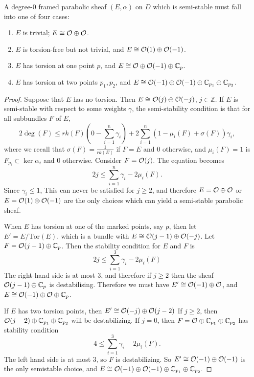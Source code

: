 	\begin{lemma}
		A degree-0 framed parabolic sheaf $(E,\alpha)$ on $D$ which is semi-stable must fall into one of four cases:
		\begin{enumerate}
			\item $E$ is trivial; $E\cong \mathcal{O}\oplus \mathcal{O}$.
			\item $E$ is torsion-free but not trivial, and $E\cong \mathcal{O}(1)\oplus\mathcal{O}(-1)$.
			\item $E$ has torsion at one point $p$, and $E\cong \mathcal{O}\oplus\mathcal{O}(-1)\oplus \mathbb{C}_p$.
			\item $E$ has torsion at two points $p_1,p_2$, and $E\cong \mathcal{O}(-1)\oplus\mathcal{O}(-1)\oplus\mathbb{C}_{p_1}\oplus \mathbb{C}_{p_2}$.
		\end{enumerate}
	\end{lemma}
	\begin{proof}
		Suppose that $E$ has no torsion. Then $E \cong \mathcal{O}(j)\oplus \mathcal{O}(-j)$, $j\in\mathbb{Z}$. If $E$ is semi-stable with respect to some weights $\gamma$, the semi-stability condition is that for all subbundles $F$ of $E$,
		\begin{equation}
			2\deg(F) \leq rk(F)\left(
			0-\sum_{i=1}^n \gamma_i
			\right) + 2\sum_{i=1}^n(1-\mu_i(F) + \sigma(F))\gamma_i,
		\end{equation}
		where we recall that $\sigma(F) = \frac{1}{rk(E)}$ if $F=E$ and $0$ otherwise, and $\mu_i(F) = 1$ is $F_{p_i} \subset \ker \alpha_i$ and $0$ otherwise. Consider $F = \mathcal{O}(j)$. The equation becomes
		\begin{equation}
			2j \leq \sum_{i=1}^n \gamma_i - 2\mu_i(F).
		\end{equation}
		Since $\gamma_i \leq 1$, This can never be satisfied for $j \geq 2$, and therefore $E = \mathcal{O}\oplus\mathcal{O}$ or $E=\mathcal{O}(1)\oplus\mathcal{O}(-1)$ are the only choices which can yield a semi-stable parabolic sheaf. 
		
		When $E$ has torsion at one of the marked points, say $p$, then let $E' = E/\text{Tor}(E)$.
		which is a bundle with $E\cong \mathcal{O}(j-1)\oplus\mathcal{O}(-j)$. Let $F=\mathcal{O}(j-1)\oplus \mathbb{C}_p$. Then the stability condition for $E$ and $F$ is
		\begin{equation}
			2j \leq \sum_{i=1}^3 \gamma_i -2\mu_i(F)
		\end{equation}
		The right-hand side is at most 3, and therefore if $j\geq 2$ then the sheaf $\mathcal{O}(j-1)\oplus \mathbb{C}_p$ is destabilising. Therefore we must have $E' \cong \mathcal{O}(-1)\oplus \mathcal{O}$, and $E \cong \mathcal{O}(-1)\oplus \mathcal{O} \oplus \mathbb{C}_p$. 
		
		If $E$ has two torsion points, then $E'\cong \mathcal{O}(-j)\oplus\mathcal{O}(j-2)$ If $j\geq 2$, then $\mathcal{O}(j-2)\oplus \mathbb{C}_{p_1}\oplus \mathbb{C}_{p_2}$ will be destabilizing. If $j=0$, then $F=\mathcal{O}\oplus\mathbb{C}_{p_1}\oplus \mathbb{C}_{p_2}$ has stability condition
		\begin{equation}
			4 \leq \sum_{i=1}^3 \gamma_i - 2\mu_i(F).
		\end{equation}
		The left hand side is at most 3, so $F$ is destabilizing. So $E' \cong \mathcal{O}(-1)\oplus \mathcal{O}(-1)$ is the only semistable choice, and $E \cong \mathcal{O}(-1)\oplus \mathcal{O}(-1)\oplus \mathbb{C}_{p_1} \oplus \mathbb{C}_{p_2}$. 
		

\end{proof}
